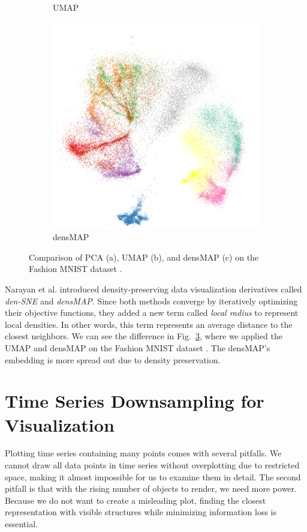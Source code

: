 \begin{figure}[h]
\begin{subfigure}[b]{0.3\textwidth}
        \caption{UMAP}
        \label{fig:fas-umap}
    \end{subfigure}
    \begin{subfigure}[b]{0.3\textwidth}
        \centering
        \includegraphics[width=\textwidth]{img/fashion-densmap.png}
        \caption{densMAP}
        \label{fig:fas-densmap}
    \end{subfigure}
    \caption{Comparison of PCA (a), UMAP (b), and densMAP (c) on the Fashion MNIST dataset \cite{vis:fashion-mnist}.}
    \label{fig:fashion}
\end{figure}

Narayan et al. \cite{vis:densMAP} introduced density-preserving data visualization derivatives called \textit{den-SNE} and \textit{densMAP}. Since both methods converge by iteratively optimizing their objective functions, they added a new term called \textit{local radius} to represent local densities. In other words, this term represents an average distance to the closest neighbors. We can see the difference in Fig.~\ref{fig:fashion}, where we applied the UMAP and densMAP on the Fashion MNIST dataset \cite{vis:fashion-mnist}. The densMAP's embedding is more spread out due to density preservation.

\section{Time Series Downsampling for Visualization}
Plotting time series containing many points comes with several pitfalls. We cannot draw all data points in time series without overplotting due to restricted space, making it almost impossible for us to examine them in detail. The second pitfall is that with the rising number of objects to render, we need more power. Because we do not want to create a misleading plot, finding the closest representation with visible structures while minimizing information loss is essential.


